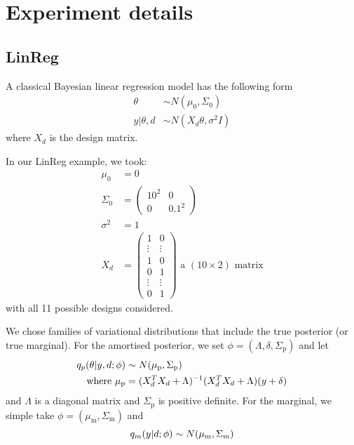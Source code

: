 \section{Experiment details}
\label{sec:expdeets}

\subsection{LinReg}
A classical Bayesian linear regression model has the following form
\begin{align}
	\theta &\sim N(\mu_0, \Sigma_0) \\
	y | \theta, d & \sim N(X_d\theta, \sigma^2 I)
\end{align}
where $X_d$ is the design matrix.

In our LinReg example, we took:
\begin{align}
	\mu_0 &= 0 \\
	\Sigma_0 &= \begin{pmatrix}
		10^2 & 0 \\
		0 & 0.1^2
	\end{pmatrix} \\
	\sigma^2 &= 1 \\
	X_d &=
	\begin{pmatrix}
		1 & 0 \\
		\vdots & \vdots \\
		1 & 0 \\
		0 & 1 \\
		\vdots & \vdots \\
		0 & 1
	\end{pmatrix} \text{ a } (10 \times 2) \text{ matrix}
\end{align}
with all 11 possible designs considered.

We chose families of variational distributions that include the true posterior (or true marginal). For the amortised posterior, we set $\phi = (\Lambda, \delta, \Sigma_\text{p})$ and let
\begin{align}
	q_p(\theta | y, d; \phi) &\sim N(\mu_\text{p}, \Sigma_\text{p}) \\
	\text{where } \mu_\text{p} &= (X_d^T X_d+\Lambda)^{-1}(X_d^T X_d + \Lambda)(y + \delta)
\end{align}
and $\Lambda$ is a diagonal matrix and $\Sigma_\text{p}$ is positive definite. For the marginal, we simple take $\phi = (\mu_\text{m}, \Sigma_\text{m})$ and
\begin{equation}
	q_m(y|d;\phi) \sim N(\mu_\text{m}, \Sigma_\text{m})
\end{equation}

